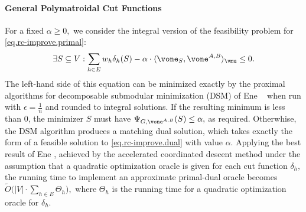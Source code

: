\documentclass[letterpaper]{article}
\begin{document}
\paragraph{General Polymatroidal Cut Functions} For a fixed $\alpha \geq 0,$ we consider the integral version of the feasibility problem for \eqref{eq.rc-improve.primal}:
$$
\exists S \subseteq V : \sum_{h \in E} w_h \delta_h(S) - \alpha \cdot \langle \vone_S, \vone^{A,B} \rangle_{\vmu} \leq 0.
$$
The left-hand side of this equation can be minimized exactly by the proximal algorithms for decomposable submodular minimization (DSM) of Ene \etal~\cite{eneRandomCoordinateDescent2015, eneDecomposableSubmodularFunction2017} when run with $\epsilon=\frac{1}{n}$ and rounded to integral solutions.
If the resulting minimum is less than $0$, the minimizer $S$ must have $\Psi_{G,\vone^{A,B}}(S) \leq \alpha,$ as required. Otherwhise, the DSM algorithm produces a matching dual solution, which takes exactly the form of a feasible solution to \eqref{eq.rc-improve.dual} with value $\alpha$. Applying the best result of Ene \etal, achieved by the accelerated coordinated descent method under the assumption that a quadratic optimization oracle is given for each cut function $\delta_h,$ the running time to implement an approximate primal-dual oracle becomes $\tilde{O}\big( |V|\cdot\sum_{h\in E}\Theta_{h}\big),$
where $\Theta_h$ is the running time for a quadratic optimization oracle for $\delta_h$.
\end{document}

